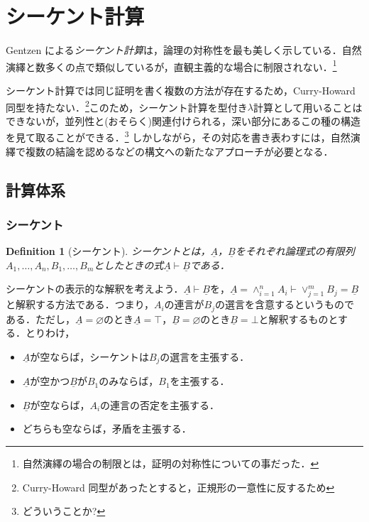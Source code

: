 \documentclass[a4paper,10pt,platex, dvipdfmx]{jsarticle}
\newtheorem{definition}{Definition}
\begin{document}
\section{シーケント計算}
Gentzen による\emph{シーケント計算}は，論理の対称性を最も美しく示している．自然演繹と数多くの点で類似しているが，直観主義的な場合に制限されない．\footnote{自然演繹の場合の制限とは，証明の対称性についての事だった．}

シーケント計算では同じ証明を書く複数の方法が存在するため，Curry-Howard 同型を持たない．\footnote{Curry-Howard 同型があったとすると，正規形の一意性に反するため}このため，シーケント計算を型付き$\lambda$計算として用いることはできないが，並列性と(おそらく)関連付けられる，深い部分にあるこの種の構造を見て取ることができる．\footnote{どういうことか?}
しかしながら，その対応を書き表わすには，自然演繹で複数の結論を認めるなどの構文への新たなアプローチが必要となる．

\subsection{計算体系}
\subsubsection{シーケント}
\begin{definition}[シーケント]
\emph{シーケント}とは，$\underline{A}$，$\underline{B}$をそれぞれ論理式の有限列$A_{1},\ldots,A_{n}, B_{1},\ldots,B_{m}$としたときの式$\underline{A}\vdash\underline{B}$である．
\end{definition}

シーケントの表示的な解釈を考えよう．$\underline{A}\vdash\underline{B}$を，$\underline{A} = \land_{i = 1}^{n}A_{i}\vdash\lor_{j = 1}^{m}B_{j} = \underline{B}$と解釈する方法である．つまり，$A_{i}$の連言が$B_{j}$の選言を含意するというものである．ただし，$\underline{A} = \varnothing$のとき$\underline{A} = \top$，$\underline{B} = \varnothing$のとき$\underline{B} = \bot$と解釈するものとする．とりわけ，
\begin{itemize}
\item $\underline{A}$が空ならば，シーケントは$B_{j}$の選言を主張する．
\item $\underline{A}$が空かつ$\underline{B}$が$B_{1}$のみならば，$B_{1}$を主張する．
\item $\underline{B}$が空ならば，$A_{i}$の連言の否定を主張する．
\item どちらも空ならば，矛盾を主張する．
\end{itemize}
\end{document}
